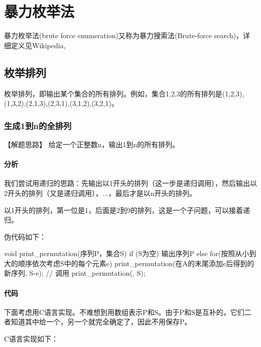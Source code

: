 \chapter{暴力枚举法}
暴力枚举法(brute force enumeration)又称为暴力搜索法(Brute-force search)，详细定义见Wikipedia, 

\section{枚举排列} %
枚举排列，即输出某个集合的所有排列。例如，集合{1,2,3}的所有排列是{(1,2,3),(1,3,2),(2,1,3),(2,3,1),(3,1,2),(3,2,1)}。

\subsection{生成1到n的全排列}

【解题思路】
给定一个正整数n，输出1到n的所有排列。

\subsubsection{分析}
我们尝试用递归的思路：先输出以1开头的排列（这一步是递归调用），然后输出以2开头的排列（又是递归调用），...，最后才是以n开头的排列。

以1开头的排列，第一位是1，后面是2到9的排列，这是一个子问题，可以接着递归。

伪代码如下：
\begin{Code}
void print_permutation(序列P，集合S) {
    if (S为空) 输出序列P
    else {
        for(按照从小到大的顺序依次考虑S中的每个元素e) {
            print_permutation(在A的末尾添加e后得到的新序列, S-{e});
        }
    }
}
// 调用
print_permutation({}, S);
\end{Code}

\subsubsection{代码}
下面考虑用C语言实现。不难想到用数组表示P和S。由于P和S是互补的，它们二者知道其中给一个，另一个就完全确定了，因此不用保存P。

C语言实现如下：

